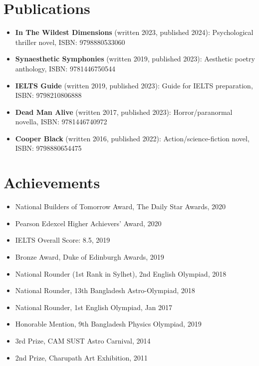 \documentclass[10pt,letterpaper]{article}
\begin{document}
\section*{Publications}
\begin{itemize}
    \item \textbf{In The Wildest Dimensions} (written 2023, published 2024): Psychological thriller novel, ISBN: 9798880533060
    \item \textbf{Synaesthetic Symphonies} (written 2019, published 2023): Aesthetic poetry anthology, ISBN: 9781446750544
    \item \textbf{IELTS Guide} (written 2019, published 2023): Guide for IELTS preparation, ISBN: 9798210806888
    \item \textbf{Dead Man Alive} (written 2017, published 2023): Horror/paranormal novella, ISBN: 9781446740972
    \item \textbf{Cooper Black} (written 2016, published 2022): Action/science-fiction novel, ISBN: 9798880654475
\end{itemize}

\section*{Achievements}
\begin{itemize}
    \item National Builders of Tomorrow Award, The Daily Star Awards, 2020
    \item Pearson Edexcel Higher Achievers' Award, 2020
    \item IELTS Overall Score: 8.5, 2019
    \item Bronze Award, Duke of Edinburgh Awards, 2019
    \item National Rounder (1st Rank in Sylhet), 2nd English Olympiad, 2018
    \item National Rounder, 13th Bangladesh Astro-Olympiad, 2018
    \item National Rounder, 1st English Olympiad, Jan 2017
    \item Honorable Mention, 9th Bangladesh Physics Olympiad, 2019
    \item 3rd Prize, CAM SUST Astro Carnival, 2014
    \item 2nd Prize, Charupath Art Exhibition, 2011
\end{itemize}
\end{document}
